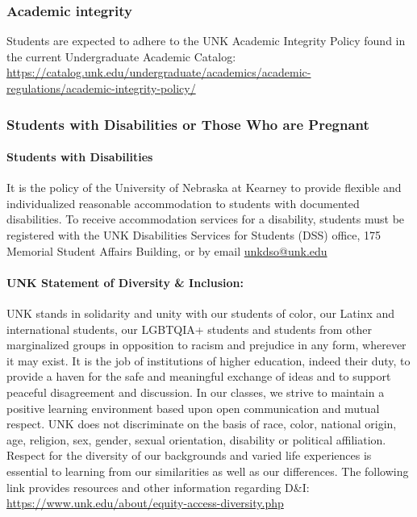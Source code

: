 \documentclass[12pt]{article}
\newcounter{ex}\setcounter{ex}{0}
\begin{document}
\subsubsection*{Academic integrity} Students are expected to adhere to 
the UNK Academic Integrity Policy found in the current Undergraduate 
Academic Catalog: 
\url{https://catalog.unk.edu/undergraduate/academics/academic-regulations/academic-integrity-policy/}

\subsubsection*{Students with Disabilities or Those Who are Pregnant}

\paragraph{Students with Disabilities} It is the policy of the University of Nebraska 
at Kearney to provide flexible and individualized reasonable 
accommodation to students with documented disabilities. To receive 
accommodation services for a disability, students must be
registered with the UNK Disabilities Services for Students (DSS) 
office, 175 Memorial Student Affairs Building, 
 or 
by email \href{mailto:unkdso@unk.edu}{unkdso@unk.edu}

\paragraph{UNK Statement of Diversity \& Inclusion:} UNK stands in solidarity and unity with our students of color, our Latinx and international students, our LGBTQIA+ students and students from other marginalized groups in opposition to racism and prejudice in any form, wherever it may exist. It is the job of institutions of higher education, indeed their duty, to provide a haven for the safe and meaningful exchange of ideas and to support peaceful disagreement and discussion. In our classes, we strive to maintain a positive learning environment based upon open communication and mutual respect. UNK does not discriminate on the basis of race, color, national origin, age, religion, sex, gender, sexual orientation, disability or political affiliation. Respect for the diversity of our backgrounds and varied 
life experiences is essential to learning from our similarities as well as our differences. The following link provides resources and other information regarding D\&I: 
\url{https://www.unk.edu/about/equity-access-diversity.php}
\end{document}

